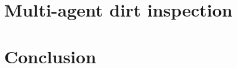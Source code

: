 \documentclass[10pt]{beamer}
\begin{document}
\section{Multi-agent dirt inspection}

\section{Conclusion}
\end{document}
